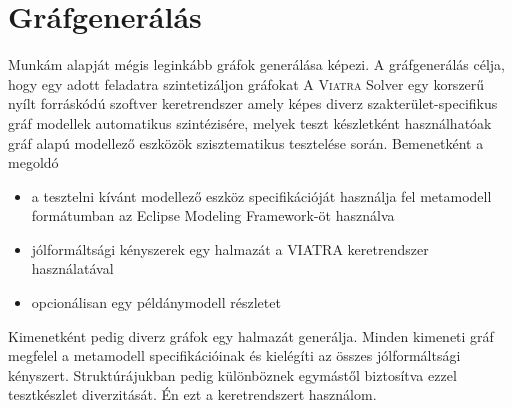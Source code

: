 \section{Gráfgenerálás}
Munkám alapját mégis leginkább gráfok generálása képezi. A gráfgenerálás célja, hogy egy adott feladatra szintetizáljon gráfokat  A \textsc{Viatra} Solver \cite{viatrasolver} egy korszerű nyílt forráskódú szoftver keretrendszer amely képes diverz szakterület-specifikus gráf modellek automatikus szintézisére, melyek teszt készletként használhatóak gráf alapú modellező eszközök szisztematikus tesztelése során. Bemenetként a megoldó 
\begin{itemize}
	\item a tesztelni kívánt modellező eszköz specifikációját használja fel metamodell formátumban az Eclipse Modeling Framework-öt használva
	\item jólformáltsági kényszerek egy halmazát a  \textsc{VIATRA} keretrendszer használatával
	\item opcionálisan egy példánymodell részletet
\end{itemize}

 Kimenetként pedig diverz gráfok egy halmazát generálja. Minden kimeneti gráf megfelel a metamodell specifikációinak és kielégíti az összes jólformáltsági kényszert. Struktúrájukban pedig különböznek egymástől biztosítva ezzel tesztkészlet diverzitását. Én ezt a keretrendszert használom.






